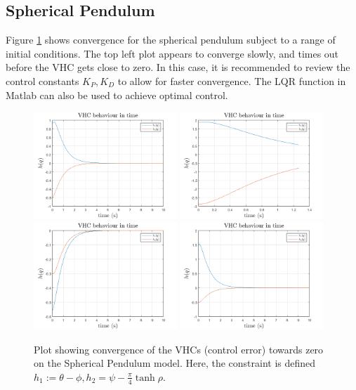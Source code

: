 \documentclass[main.tex]{subfiles}
\begin{document}
\subsection{Spherical Pendulum}
Figure \ref{fig:graph-pendulum} shows convergence for the spherical pendulum subject to a range of initial conditions. The top left plot appears to converge slowly, and times out before the VHC gets close to zero. In this case, it is recommended to review the control constants $K_P,K_D$ to allow for faster convergence. The LQR function in Matlab can also be used to achieve optimal control.
\begin{figure}[h]
    \centering
    \includegraphics[width=0.48\textwidth]{assets/sp1.png}
    \includegraphics[width=0.48\textwidth]{assets/sp2.png}
    \includegraphics[width=0.48\textwidth]{assets/sp3.png}
    \includegraphics[width=0.48\textwidth]{assets/sp4.png}
        \caption{Plot showing convergence of the VHCs (control error) towards zero on the Spherical Pendulum model. Here, the constraint is defined $h_1:=\theta-\phi, h_2=\psi-\frac{\pi}{4}\tanh \rho.$}
    \label{fig:graph-pendulum}
\end{figure}
\end{document}
